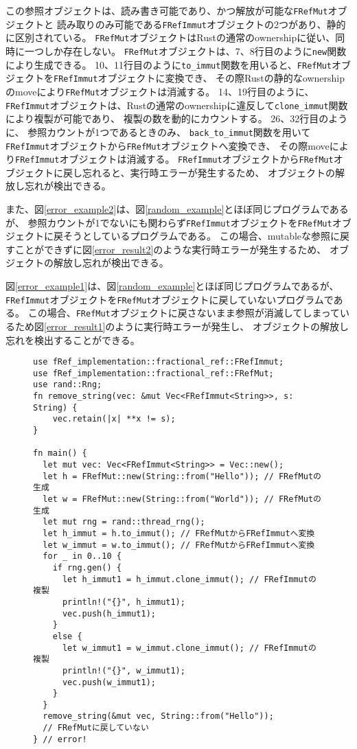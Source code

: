 \documentclass{sumiilab-paper}
\theoremstyle{mystyle}
\numberwithin{definition}{chapter} %
\begin{document}
この参照オブジェクトは、読み書き可能であり、かつ解放が可能な\texttt{FRefMut}オブジェクトと
読み取りのみ可能である\texttt{FRefImmut}オブジェクトの2つがあり、静的に区別されている。
\texttt{FRefMut}オブジェクトはRustの通常のownershipに従い、同時に一つしか存在しない。
\texttt{FRefMut}オブジェクトは、7、8行目のように\texttt{new}関数により生成できる。
10、11行目のように\texttt{to\_immut}関数を用いると、\texttt{FRefMut}オブジェクトを\texttt{FRefImmut}オブジェクトに変換でき、
その際Rustの静的なownershipのmoveにより\texttt{FRefMut}オブジェクトは消滅する。
14、19行目のように、
\texttt{FRefImmut}オブジェクトは、Rustの通常のownershipに違反して\texttt{clone\_immut}関数により複製が可能であり、
複製の数を動的にカウントする。
26、32行目のように、
参照カウントが1つであるときのみ、
\texttt{back\_to\_immut}関数を用いて\texttt{FRefImmut}オブジェクトから\texttt{FRefMut}オブジェクトへ変換でき、
その際moveにより\texttt{FRefImmut}オブジェクトは消滅する。
\texttt{FRefImmut}オブジェクトから\texttt{FRefMut}オブジェクトに戻し忘れると、実行時エラーが発生するため、
オブジェクトの解放し忘れが検出できる。

また、図\ref{error_example2}は、図\ref{random_example}とほぼ同じプログラムであるが、
参照カウントが1でないにも関わらず\texttt{FRefImmut}オブジェクトを\texttt{FRefMut}オブジェクトに戻そうとしているプログラムである。
この場合、mutableな参照に戻すことができずに図\ref{error_result2}のような実行時エラーが発生するため、
オブジェクトの解放し忘れが検出できる。

図\ref{error_example1}は、図\ref{random_example}とほぼ同じプログラムであるが、
\texttt{FRefImmut}オブジェクトを\texttt{FRefMut}オブジェクトに戻していないプログラムである。
この場合、\texttt{FRefMut}オブジェクトに戻さないまま参照が消滅してしまっているため図\ref{error_result1}のように実行時エラーが発生し、
オブジェクトの解放し忘れを検出することができる。

\begin{figure}[htp]
\begin{lstlisting}[caption=オブジェクトの解放し忘れを検出する例, 
  label=error_example1, captionpos=b]
use fRef_implementation::fractional_ref::FRefImmut;
use fRef_implementation::fractional_ref::FRefMut;
use rand::Rng;
fn remove_string(vec: &mut Vec<FRefImmut<String>>, s: String) {
    vec.retain(|x| **x != s);
}

fn main() {
  let mut vec: Vec<FRefImmut<String>> = Vec::new();
  let h = FRefMut::new(String::from("Hello")); // FRefMutの生成
  let w = FRefMut::new(String::from("World")); // FRefMutの生成
  let mut rng = rand::thread_rng();
  let h_immut = h.to_immut(); // FRefMutからFRefImmutへ変換
  let w_immut = w.to_immut(); // FRefMutからFRefImmutへ変換
  for _ in 0..10 {
    if rng.gen() {
      let h_immut1 = h_immut.clone_immut(); // FRefImmutの複製
      println!("{}", h_immut1);
      vec.push(h_immut1);
    }
    else {
      let w_immut1 = w_immut.clone_immut(); // FRefImmutの複製
      println!("{}", w_immut1);
      vec.push(w_immut1);
    }
  }
  remove_string(&mut vec, String::from("Hello"));
  // FRefMutに戻していない
} // error!
\end{lstlisting}
\end{figure}
\end{document}
